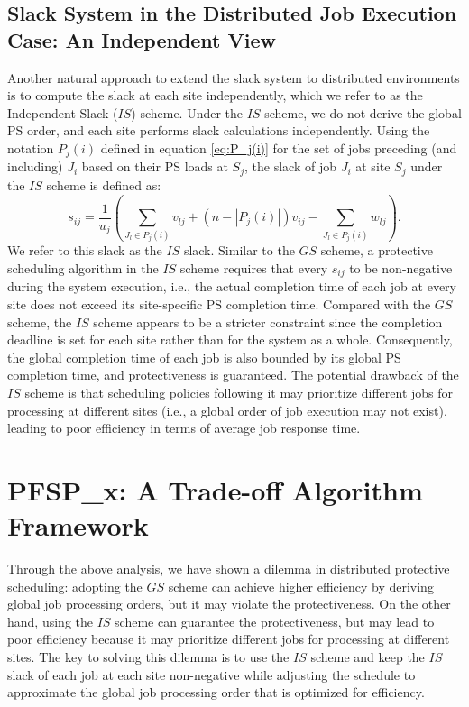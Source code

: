 \subsection{Slack System in the Distributed Job Execution Case: An Independent View}
Another natural approach to extend the slack system to distributed environments is to compute the slack at each site independently, which we refer to as the Independent Slack ($IS$) scheme. Under the $IS$ scheme, we do not derive the global PS order, and each site performs slack calculations independently. Using the notation $P_j(i)$ defined in equation \ref{eq:P_j(i)} for the set of jobs preceding (and including) $J_i$ based on their PS loads at $S_j$, the slack of job $J_i$ at site $S_j$ under the $IS$ scheme is defined as:
\begin{equation}
    \label{eq:slack_IS}
    s_{ij} = \frac{1}{u_j}\left(\sum_{J_l \in P_j(i)}v_{lj} + (n - |P_j(i)|)v_{ij} - \sum_{J_l \in P_j(i)}w_{lj}\right).
\end{equation}
We refer to this slack as the $IS$ slack. Similar to the $GS$ scheme, a protective scheduling algorithm in the $IS$ scheme requires that every $s_{ij}$ to be non-negative during the system execution, i.e., the actual completion time of each job at every site does not exceed its site-specific PS completion time. Compared with the $GS$ scheme, the $IS$ scheme appears to be a stricter constraint since the completion deadline is set for each site rather than for the system as a whole. Consequently, the global completion time of each job is also bounded by its global PS completion time, and protectiveness is guaranteed. The potential drawback of the $IS$ scheme is that scheduling policies following it may prioritize different jobs for processing at different sites (i.e., a global order of job execution may not exist), leading to poor efficiency in terms of average job response time. 


\section{PFSP\_x: A Trade-off Algorithm Framework}
\label{sec:PFSP_x}
Through the above analysis, we have shown a dilemma in distributed protective scheduling: adopting the $GS$ scheme can achieve higher efficiency by deriving global job processing orders, but it may violate the protectiveness. On the other hand, using the $IS$ scheme can guarantee the protectiveness, but may lead to poor efficiency because it may prioritize different jobs for processing at different sites. The key to solving this dilemma is to use the $IS$ scheme and keep the $IS$ slack of each job at each site non-negative while adjusting the schedule to approximate the global job processing order that is optimized for efficiency.%

